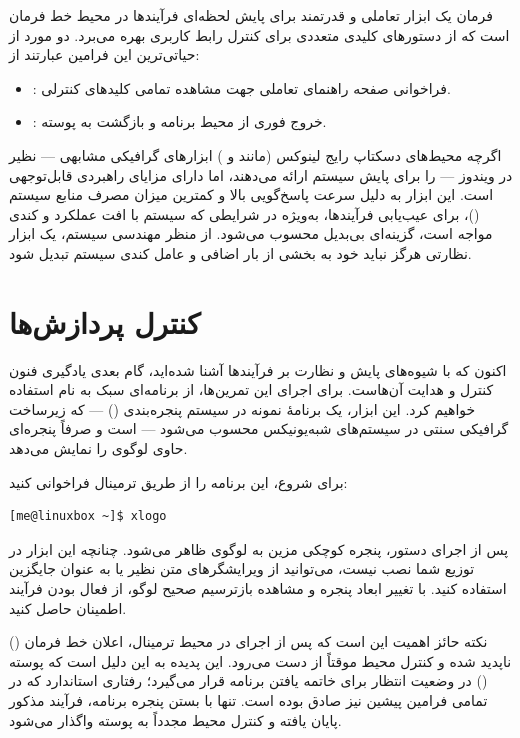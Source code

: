 فرمان  یک ابزار تعاملی و قدرتمند برای پایش لحظه‌ای فرآیندها در محیط خط فرمان است که از دستورهای کلیدی متعددی برای کنترل رابط کاربری بهره می‌برد. دو مورد از حیاتی‌ترین این فرامین عبارتند از:

\begin{itemize}
  \item {}: فراخوانی صفحه راهنمای تعاملی جهت مشاهده تمامی کلیدهای کنترلی.
  \item {}: خروج فوری از محیط برنامه و بازگشت به پوسته.
\end{itemize}

اگرچه محیط‌های دسکتاپ رایج لینوکس (مانند  و ) ابزارهای گرافیکی مشابهی — نظیر  در ویندوز — را برای پایش سیستم ارائه می‌دهند، اما  دارای مزایای راهبردی قابل‌توجهی است. این ابزار به دلیل سرعت پاسخ‌گویی بالا و کمترین میزان مصرف منابع سیستم ()، برای عیب‌یابی فرآیندها، به‌ویژه در شرایطی که سیستم با افت عملکرد و کندی مواجه است، گزینه‌ای بی‌بدیل محسوب می‌شود. از منظر مهندسی سیستم، یک ابزار نظارتی هرگز نباید خود به بخشی از بار اضافی و عامل کندی سیستم تبدیل شود.

\section{کنترل پردازش‌ها}

اکنون که با شیوه‌های پایش و نظارت بر فرآیندها آشنا شده‌اید، گام بعدی یادگیری فنون کنترل و هدایت آن‌هاست. برای اجرای این تمرین‌ها، از برنامه‌ای سبک به نام  استفاده خواهیم کرد. این ابزار، یک برنامهٔ نمونه در سیستم پنجره‌بندی  () — که زیرساخت گرافیکی سنتی در سیستم‌های شبه‌یونیکس محسوب می‌شود — است و صرفاً پنجره‌ای حاوی لوگوی  را نمایش می‌دهد.

برای شروع، این برنامه را از طریق ترمینال فراخوانی کنید:

\begin{latin}
\begin{lstlisting}
[me@linuxbox ~]$ xlogo
\end{lstlisting}
\end{latin}

پس از اجرای دستور، پنجره کوچکی مزین به لوگوی  ظاهر می‌شود. چنانچه این ابزار در توزیع شما نصب نیست، می‌توانید از ویرایشگرهای متن نظیر  یا  به عنوان جایگزین استفاده کنید. با تغییر ابعاد پنجره و مشاهده بازترسیم صحیح لوگو، از فعال بودن فرآیند اطمینان حاصل کنید.

نکته حائز اهمیت این است که پس از اجرای  در محیط ترمینال، اعلان خط فرمان () ناپدید شده و کنترل محیط موقتاً از دست می‌رود. این پدیده به این دلیل است که پوسته () در وضعیت انتظار برای خاتمه یافتن برنامه قرار می‌گیرد؛ رفتاری استاندارد که در تمامی فرامین پیشین نیز صادق بوده است. تنها با بستن پنجره برنامه، فرآیند مذکور پایان یافته و کنترل محیط مجدداً به پوسته واگذار می‌شود.

